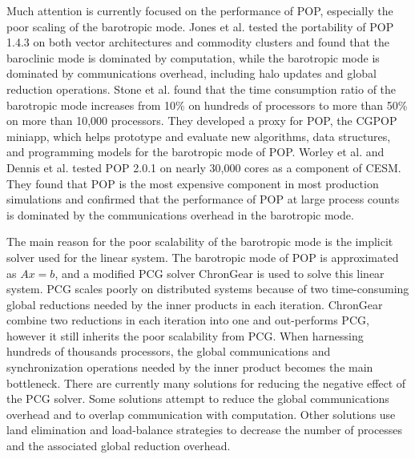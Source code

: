 \documentclass{sig-alternate}
\begin{document}
Much attention is currently focused on the performance of POP, especially the poor scaling of the barotropic mode.
Jones et al. \cite{pop05} tested the portability of POP 1.4.3 on both vector architectures and commodity clusters and found that the baroclinic mode is dominated by computation, while the barotropic mode is dominated by communications overhead, including halo updates and global reduction operations. Stone et al. \cite{stone2011cgpop} found that the time consumption ratio of the barotropic mode increases from 10\% on hundreds of processors to more than 50\% on more than 10,000 processors.
They developed a proxy for POP, the CGPOP miniapp, which helps prototype and evaluate new algorithms, data structures, and programming models for the barotropic mode of POP.
Worley et al. \cite{Worley:2011:PCE:2063384.2063457} and Dennis et al. \cite{dennis2012computational} tested POP 2.0.1 on nearly 30,000 cores as a component of CESM. They found that POP is the most expensive component in most production simulations and confirmed that the performance of POP at large process counts is dominated by the communications overhead in the barotropic mode.

The main reason for the poor scalability of the barotropic mode is the implicit solver used for the linear system. 
The barotropic mode of POP is approximated as $Ax=b$, and a modified PCG solver ChronGear is used to solve this linear system. 
PCG scales poorly on distributed systems because of two time-consuming global reductions needed by the inner products in each iteration.
ChronGear combine two reductions in each iteration into one and out-performs PCG, however it still inherits the poor scalability from PCG. 
When harnessing hundreds of thousands processors, the global communications and synchronization operations needed by the inner product becomes the main bottleneck.
There are currently many solutions for reducing the negative effect of the PCG solver. 
Some solutions attempt to reduce the global communications overhead\cite{dAzevedo1999lapack} and to overlap communication with computation\cite{beare1997optimisation}. 
Other solutions use land elimination and load-balance strategies\cite{dennis2007inverse, dennis2008scaling} to decrease the number of processes and the associated global reduction overhead.
\end{document}
